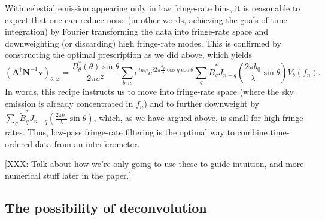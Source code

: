 \documentclass[twocolumn,apj,numberedappendix]{emulateapj}
\newcommand{\vis}{\mathbf{v}}
\newcommand{\A}{\mathbf{A}}
\newcommand{\N}{\mathbf{N}}
\begin{document}
With celestial emission appearing only in low fringe-rate bins, it is
reasonable to expect that one can reduce noise (in other words, achieving the
goals of time integration) by Fourier transforming the data into fringe-rate
space and downweighting (or discarding) high fringe-rate modes.  This is
confirmed by constructing the optimal prescription as we did above, which
yields
\begin{equation}
\left( \A^\dagger \N^{-1} \vis \right)_{\theta,\varphi} = \frac{B_\theta^* (\theta)  \sin \theta}{2\pi \sigma^2} \sum_{b,n} e^{i n \varphi} e^{i 2 \pi  \frac{b_y}{\lambda} \cos \eta \cos \theta} \sum_{q} \widetilde{B}_q^* J_{n-q} \left( \frac{2 \pi b_0}{\lambda} \sin \theta \right) \widetilde{V}_b (f_n).
\end{equation}
In words, this recipe instructs us to move into fringe-rate space (where the
sky emission is already concentrated in $f_n$) and to further downweight by
$\sum_{q} \widetilde{B}_q^* J_{n-q} \left( \frac{2 \pi b_0}{\lambda} \sin
\theta \right)$, which, as we have argued above, is small for high fringe
rates.  Thus, low-pass fringe-rate filtering is the optimal way to combine
time-ordered data from an interferometer.

[XXX: Talk about how we're only going to use these to guide intuition, and more numerical stuff later in the paper.]

\subsection{The possibility of deconvolution}
\end{document}
